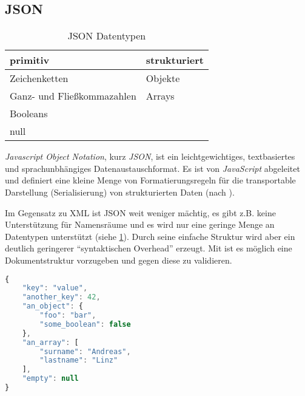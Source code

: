 \subsection{JSON}

\begin{table}[htb]
    \begin{longtable}{l l}
    \toprule
    \rowcolor{lightgray}
    \textbf{primitiv}   & \textbf{strukturiert}\\
    \midrule
    Zeichenketten       & Objekte\\
    Ganz- und 
    Fließkommazahlen    & Arrays\\
    Booleans            & \\
    null                & \\
    \bottomrule
    \end{longtable}
    \caption{JSON Datentypen}
    \label{tab:jsonDatatypes}
\end{table}

\emph{Javascript Object Notation}, kurz \emph{JSON}, ist ein leichtgewichtiges, textbasiertes und sprachunbhängiges Datenaustauschformat. Es ist von \emph{JavaScript} abgeleitet und definiert eine kleine Menge von Formatierungsregeln für die transportable Darstellung (Serialisierung) von strukturierten Daten (nach \cite{JSONRFC}).

Im Gegensatz zu XML ist JSON weit weniger mächtig, es gibt z.B. keine Unterstützung für Namensräume und es wird nur eine geringe Menge an Datentypen unterstützt (siehe \cref{tab:jsonDatatypes}). 
Durch seine einfache Struktur wird aber ein deutlich geringerer \enquote{syntaktischen Overhead} erzeugt.
Mit  ist es möglich eine Dokumentstruktur vorzugeben und gegen diese zu validieren. 

%
%
\begin{minipage}{\textwidth}
    \begin{lstlisting}[language=JavaScript, caption=Minimalbeispiel für eine JSON-Datei]
{
    "key": "value",
    "another_key": 42,
    "an_object": {
        "foo": "bar",
        "some_boolean": false
    },
    "an_array": [
        "surname": "Andreas",
        "lastname": "Linz"
    ],
    "empty": null
}
    \end{lstlisting}
\end{minipage}